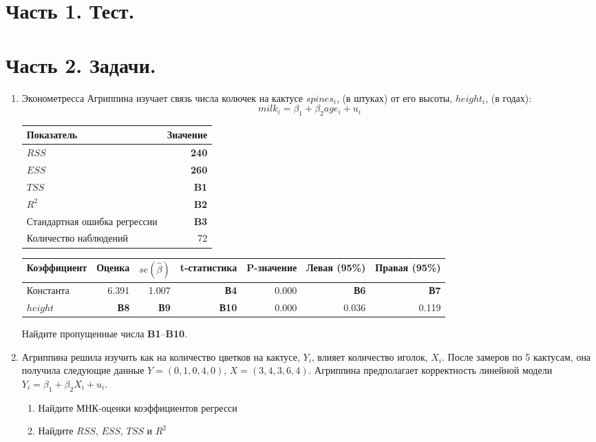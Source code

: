 \documentclass[12pt]{article}\usepackage[]{graphicx}\usepackage[svgnames]{xcolor}
\def \hb{\hat{\beta}}
\begin{document}
\section*{Часть 1. Тест.}


\section*{Часть 2. Задачи.}


\begin{enumerate}

\item Эконометресса Агриппина изучает связь числа колючек на кактусе $spines_i$, (в штуках) от его высоты, $height_i$, (в годах):
\[
milk_i = \beta_1 + \beta_2 age_i + u_i
\]

\begin{tabular}{lr} \toprule
Показатель & Значение \\
\midrule
$RSS$                        & \textbf{240} \\
$ESS$                        & \textbf{260} \\
$TSS$                        & \textbf{B1} \\
$R^2$                        & \textbf{B2} \\
Стандартная ошибка регрессии & \textbf{B3} \\
Количество наблюдений        & 72 \\
\bottomrule
\end{tabular}

\begin{tabular}{lrrrrrr} \toprule
Коэффициент & Оценка & $se(\hb)$ & t-статистика & P-значение & Левая (95\%) & Правая (95\%) \\
\midrule
Константа & 6.391 & 1.007 & \textbf{В4} & 0.000 & \textbf{В6} & \textbf{В7} \\
$height$ & \textbf{В8} & \textbf{В9} & \textbf{В10} & 0.000 & 0.036 & 0.119 \\
\bottomrule
\end{tabular}

Найдите пропущенные числа \textbf{B1}--\textbf{B10}.




\item Агриппина решила изучить как на количество цветков на кактусе, $Y_i$, влияет количество иголок, $X_i$. После замеров по 5 кактусам, она получила следующие данные $Y = (0,1,0,4,0)$, $X = (3,4,3,6,4)$. Агриппина предполагает корректность линейной модели $Y_i = \beta_1 + \beta_2 X_i + u_i$.
\begin{enumerate}
\item Найдите МНК-оценки коэффициентов регресси
\item Найдите $RSS$, $ESS$, $TSS$ и $R^2$
\end{enumerate}




\end{enumerate}
\end{document}
